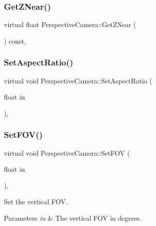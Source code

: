 \subsubsection{\texorpdfstring{Get\+Z\+Near()}{GetZNear()}}
{\footnotesize\ttfamily virtual float Perspective\+Camera\+::\+Get\+Z\+Near (\begin{DoxyParamCaption}{ }\end{DoxyParamCaption}) const\hspace{0.3cm}{\ttfamily [inline]}, {\ttfamily [virtual]}}

\hypertarget{class_perspective_camera_a2f8753cd16d119ed00d050b4dbac2510}{}\label{class_perspective_camera_a2f8753cd16d119ed00d050b4dbac2510} 
\subsubsection{\texorpdfstring{Set\+Aspect\+Ratio()}{SetAspectRatio()}}
{\footnotesize\ttfamily virtual void Perspective\+Camera\+::\+Set\+Aspect\+Ratio (\begin{DoxyParamCaption}\item[{float}]{in }\end{DoxyParamCaption})\hspace{0.3cm}{\ttfamily [inline]}, {\ttfamily [virtual]}}

\hypertarget{class_perspective_camera_a03f2ce1c0940599712b12a07719b5122}{}\label{class_perspective_camera_a03f2ce1c0940599712b12a07719b5122} 
\subsubsection{\texorpdfstring{Set\+F\+O\+V()}{SetFOV()}}
{\footnotesize\ttfamily virtual void Perspective\+Camera\+::\+Set\+F\+OV (\begin{DoxyParamCaption}\item[{float}]{in }\end{DoxyParamCaption})\hspace{0.3cm}{\ttfamily [inline]}, {\ttfamily [virtual]}}



Set the vertical F\+OV. 


\begin{DoxyParams}{Parameters}
{\em in} & The vertical F\+OV in degrees. \\
\hline
\end{DoxyParams}
\hypertarget{class_perspective_camera_a4374ca73880370dad1b93eaf489c9bb4}{}\label{class_perspective_camera_a4374ca73880370dad1b93eaf489c9bb4} 
